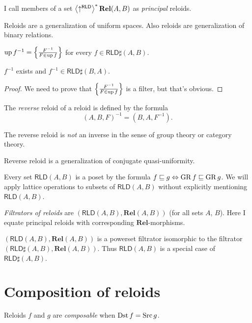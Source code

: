 \begin{defn}
I call members of a set $\left\langle \uparrow^{\mathsf{RLD}}\right\rangle ^{\ast}\mathbf{Rel}(A,B)$
as \emph{principal} reloids.
\end{defn}

Reloids are a generalization of uniform spaces. Also reloids are generalization
of binary relations.

\begin{defn}
$\operatorname{up} f^{-1} = \left\{ \frac{F^{-1}}{F\in\operatorname{up} f}\right\}$ for every $f\in\mathsf{RLD}\sharp(A,B)$.
\end{defn}

\begin{prop}
$f^{-1}$ exists and $f^{-1}\in\mathsf{RLD}\sharp(B,A)$.
\end{prop}

\begin{proof}
We need to prove that $\left\{ \frac{F^{-1}}{F\in\operatorname{up} f}\right\}$ is a filter, but that's obvious.
\end{proof}

\begin{defn}
The \emph{reverse} reloid of a reloid is defined
by the formula
\[
(A,B,F)^{-1}=(B,A,F^{-1}).
\]
\end{defn}
\begin{note}
The reverse reloid is \emph{not} an inverse in the sense of group
theory or category theory.
\end{note}
Reverse reloid is a generalization of conjugate quasi-uniformity.
\begin{defn}
Every set $\mathsf{RLD}(A,B)$ is a poset by the formula $f\sqsubseteq g\Leftrightarrow\operatorname{GR} f\sqsubseteq\operatorname{GR} g$.
We will apply lattice operations to subsets of $\mathsf{RLD}(A,B)$
without explicitly mentioning $\mathsf{RLD}(A,B)$.\end{defn}

\emph{Filtrators of reloids} are $(\mathsf{RLD}(A,B),\mathbf{Rel}(A,B))$
(for all sets $A$, $B$). Here I equate principal reloids with corresponding $\mathbf{Rel}$-morphisms.

\begin{obvious}
$(\mathsf{RLD}(A,B),\mathbf{Rel}(A,B))$ is a powerset filtrator isomorphic to the filtrator
$(\mathsf{RLD}\sharp(A,B),\mathbf{Rel}(A,B))$. Thus $\mathsf{RLD}(A,B)$ is a special case of $\mathsf{RLD}\sharp(A,B)$.
\end{obvious}

\section{Composition of reloids}
\begin{defn}
Reloids $f$ and $g$ are \emph{composable}
when $\operatorname{Dst} f=\operatorname{Src} g$.
\end{defn}

